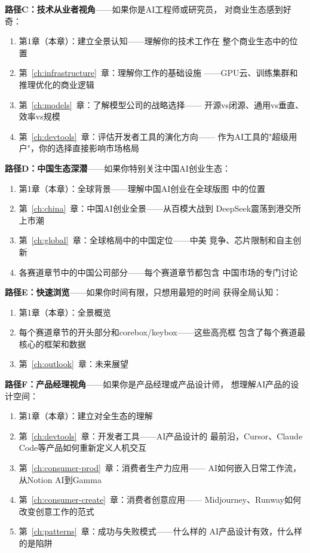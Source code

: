 \textbf{路径C：技术从业者视角}——如果你是AI工程师或研究员，
对商业生态感到好奇：
\begin{enumerate}
  \item 第1章（本章）：建立全景认知——理解你的技术工作在
    整个商业生态中的位置
  \item 第~\ref{ch:infrastructure}~章：理解你工作的基础设施
    ——GPU云、训练集群和推理优化的商业逻辑
  \item 第~\ref{ch:models}~章：了解模型公司的战略选择——
    开源vs闭源、通用vs垂直、效率vs规模
  \item 第~\ref{ch:devtools}~章：评估开发者工具的演化方向——
    作为AI工具的"超级用户"，你的选择直接影响市场格局
\end{enumerate}

\textbf{路径D：中国生态深潜}——如果你特别关注中国AI创业生态：
\begin{enumerate}
  \item 第1章（本章）：全球背景——理解中国AI创业在全球版图
    中的位置
  \item 第~\ref{ch:china}~章：中国AI创业全景——从百模大战到
    DeepSeek震荡到港交所上市潮
  \item 第~\ref{ch:global}~章：全球格局中的中国定位——中美
    竞争、芯片限制和自主创新
  \item 各赛道章节中的中国公司部分——每个赛道章节都包含
    中国市场的专门讨论
\end{enumerate}

\textbf{路径E：快速浏览}——如果你时间有限，只想用最短的时间
获得全局认知：
\begin{enumerate}
  \item 第1章（本章）：全景概览
  \item 每个赛道章节的开头部分和corebox/keybox——这些高亮框
    包含了每个赛道最核心的框架和数据
  \item 第~\ref{ch:outlook}~章：未来展望
\end{enumerate}

\textbf{路径F：产品经理视角}——如果你是产品经理或产品设计师，
想理解AI产品的设计空间：
\begin{enumerate}
  \item 第1章（本章）：建立对全生态的理解
  \item 第~\ref{ch:devtools}~章：开发者工具——AI产品设计的
    最前沿，Cursor、Claude Code等产品如何重新定义人机交互
  \item 第~\ref{ch:consumer-prod}~章：消费者生产力应用——
    AI如何嵌入日常工作流，从Notion AI到Gamma
  \item 第~\ref{ch:consumer-create}~章：消费者创意应用——
    Midjourney、Runway如何改变创意工作的范式
  \item 第~\ref{ch:patterns}~章：成功与失败模式——什么样的
    AI产品设计有效，什么样的是陷阱
\end{enumerate}

